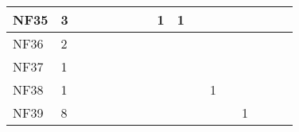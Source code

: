 \begin{table}[]
{\begin{tabular}{|l|l|l|l|l|l|l|l|l|l|l|l|l|l|l|l|l|}
NF35          & 3                                                     &                                                       &    &                                                       &    &                                                       &                                                       & 1  & 1  &                                                       &    &                                                  &                                                  &    &    &    \\ \hline
NF36          & 2                                                     &                                                       &    &                                                       &    &                                                       &                                                       &    &    &                                                       &    &                                                  &                                                  &    &    &    \\ \hline
NF37          & 1                                                     &                                                       &    &                                                       &    &                                                       &                                                       &    &    &                                                       &    &                                                  &                                                  &    &    &    \\ \hline
NF38          & 1                                                     &                                                       &    &                                                       &    &                                                       &                                                       &    &    &                                                       & 1  &                                                  &                                                  &    &    &    \\ \hline
NF39          & 8                                                     &                                                       &    &                                                       &    &                                                       &                                                       &    &    &                                                       &    &                                                  & 1                                                &    &    &    \\ \hline

\end{tabular}}
\end{table}
